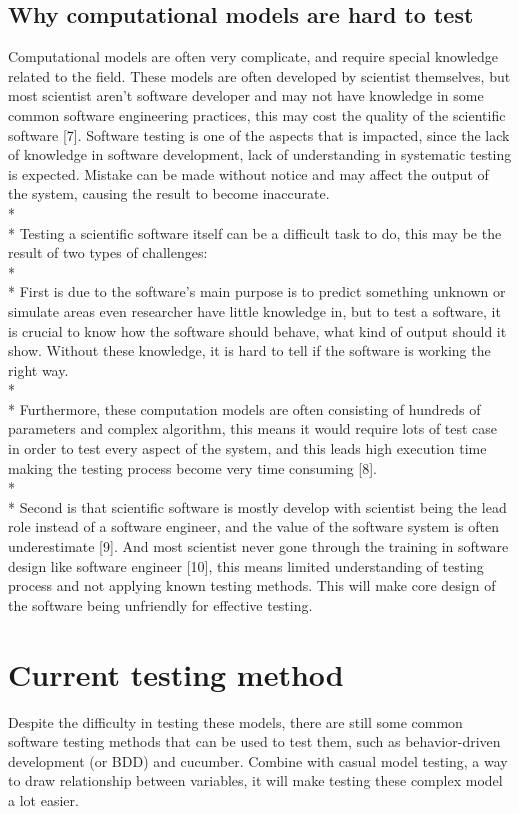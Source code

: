 \subsection{Why computational models are hard to test}
Computational models are often very complicate, and require special knowledge related to the field. These models are often developed by scientist themselves, but most scientist aren’t software developer and may not have knowledge in some common software engineering practices, this may cost the quality of the scientific software [7]. Software testing is one of the aspects that is impacted, since the lack of knowledge in software development, lack of understanding in systematic testing is expected. Mistake can be made without notice and may affect the output of the system, causing the result to become inaccurate.\\*\\*
Testing a scientific software itself can be a difficult task to do, this may be the result of two types of challenges: \\*\\*
First is due to the software’s main purpose is to predict something unknown or simulate areas even researcher have little knowledge in, but to test a software, it is crucial to know how the software should behave, what kind of output should it show. 
Without these knowledge, it is hard to tell if the software is working the right way. \\*\\*
Furthermore, these computation models are often consisting of hundreds of parameters and complex algorithm, this means it would require lots of test case in order to test every aspect of the system, and this leads high execution time making the testing process become very time consuming [8].\\*\\*
Second is that scientific software is mostly develop with scientist being the lead role instead of a software engineer, and the value of the software system is often underestimate [9]. And most scientist never gone through the training in software design like software engineer [10], this means limited understanding of testing process and not applying known testing methods. This will make core design of the software being unfriendly for effective testing.

\section{Current testing method}
Despite the difficulty in testing these models, there are still some common software testing methods that can be used to test them, such as behavior-driven development (or BDD) and cucumber. Combine with casual model testing, a way to draw relationship between variables, it will make testing these complex model a lot easier.
